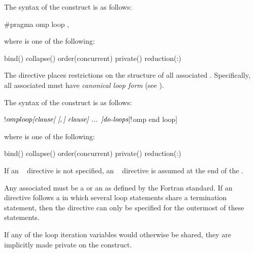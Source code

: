 \syntax
\begin{ccppspecific}
The syntax of the  construct is as follows:
\begin{ompcPragma}
#pragma omp loop \plc{[clause[ [},\plc{] clause] ... ] new-line}
\end{ompcPragma}

where  is one of the following:

\begin{indentedcodelist}
bind()
collapse()
order(concurrent)
private()
reduction(:)
\end{indentedcodelist}
The  directive places restrictions on the structure of all associated .
Specifically, all associated  must have \emph{canonical loop form} (see
).
\end{ccppspecific}

\begin{fortranspecific}
The syntax of the  construct is as follows:

\begin{ompfPragma}
!$omp loop \plc{[clause[ [},\plc{] clause] ... ]}
   \plc{do-loops}
[!$omp end loop]
\end{ompfPragma}

\begin{samepage}
where  is one of the following:

\begin{indentedcodelist}
bind()
collapse()
order(concurrent)
private()
reduction(:)
\end{indentedcodelist}
\end{samepage}

If an ~ directive is not specified, an
  ~ directive is assumed at the end of the
.

Any associated  must be a  or an
 as defined by the Fortran standard. If
an ~ directive follows a  in
which several loop statements share a  termination statement,
then the directive can only be specified for the outermost of these
 statements.

If any of the loop iteration variables would otherwise be shared, they are implicitly
  made private on the  construct.
\end{fortranspecific}


